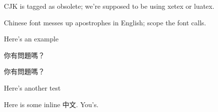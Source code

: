 \documentclass{article}
\begin{document}
CJK is tagged as obsolete; we're supposed to be using xetex or luatex.

Chinese font messes up apostrophes in English; scope the font calls.

{ \setmainfont{Noto Serif CJK TC}
\setsansfont{Noto Sans CJK TC}
Here's an example


你有問題嗎？

\sffamily
你有問題嗎？
}

Here's another test

Here is some inline 
{ \setmainfont{Noto Serif CJK TC} 中文}. You's.
\end{document}
